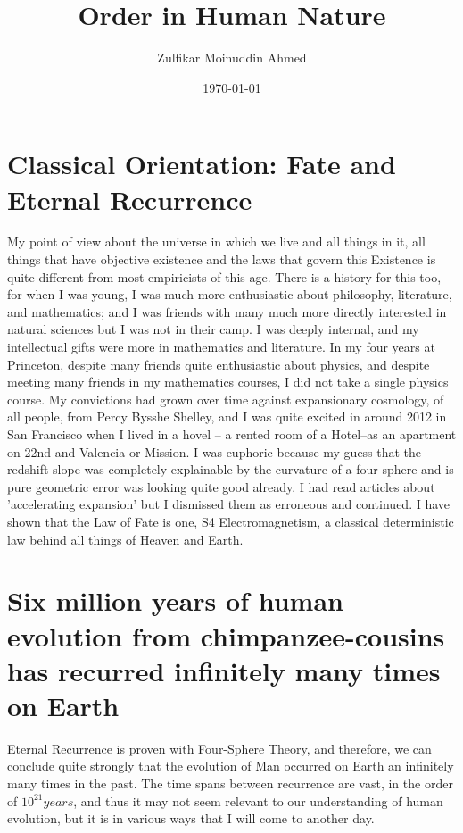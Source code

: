 \documentclass{amsart}
\title{Order in Human Nature}
\author{Zulfikar Moinuddin Ahmed}
\date{\today}
\begin{document}
\maketitle

\section{Classical Orientation: Fate and Eternal Recurrence}

My point of view about the universe in which we live and all things in it, all things that have objective existence and the laws that govern this Existence is quite different from most empiricists of this age.  There is a history for this too, for when I was young, I was much more enthusiastic about philosophy, literature, and mathematics; and I was friends with many much more directly interested in natural sciences but I was not in their camp.  I was deeply internal, and my intellectual gifts were more in mathematics and literature.  In my four years at Princeton, despite many friends quite enthusiastic about physics, and despite meeting many friends in my mathematics courses, I did not take a single physics course.  My convictions had grown over time against expansionary cosmology, of all people, from Percy Bysshe Shelley, and I was quite excited in around 2012 in San Francisco when I lived in a hovel -- a rented room of a Hotel--as an apartment on 22nd and Valencia or Mission. I was euphoric because my guess that the redshift slope was completely explainable by the curvature of a four-sphere and is pure geometric error was looking quite good already.  I had read articles about 'accelerating expansion' but I dismissed them as erroneous and continued.  I have shown that the Law of Fate is one, S4 Electromagnetism, a classical deterministic law behind all things of Heaven and Earth.

\section{Six million years of human evolution from chimpanzee-cousins has recurred infinitely many times on Earth}

Eternal Recurrence is proven with Four-Sphere Theory, and therefore, we can conclude quite strongly that the evolution of Man occurred on Earth an infinitely many times in the past.  The time spans between recurrence are vast, in the order of $10^{21} years$, and thus it may not seem relevant to our understanding of human evolution, but it is in various ways that I will come to another day.  
\end{document}
